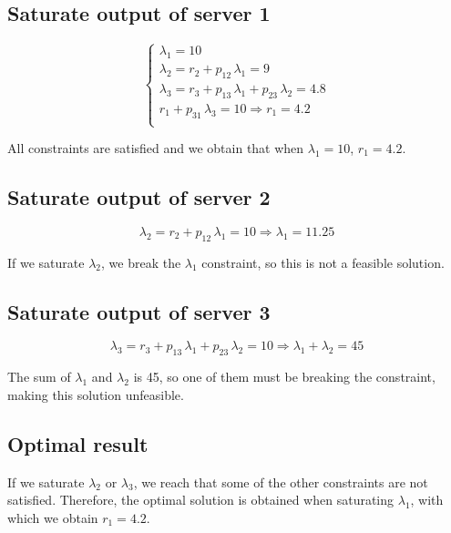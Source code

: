 \documentclass{article}
\begin{document}
\subsection{Saturate output of server 1}

\begin{equation}
  \begin{cases}
    \lambda_1=10 \\
    \lambda_2 = r_2 + p_{12} \, \lambda_1 = 9\\
    \lambda_3 = r_3 + p_{13} \, \lambda_1 + p_{23}\,\lambda_2 = 4.8 \\
    r_1 + p_{31}\,\lambda_3=10 \Rightarrow r_1 = 4.2\\
  \end{cases}
\end{equation}

All constraints are satisfied and we obtain that when $\lambda_1=10$, $r_1=4.2$.

\subsection{Saturate output of server 2}

\begin{equation}
  \lambda_2=r_2+p_{12}\,\lambda_1 =10 \Rightarrow \lambda_1 = 11.25
\end{equation}

If we saturate $\lambda_2$, we break the $\lambda_1$ constraint, so this is not a feasible solution.

\subsection{Saturate output of server 3}

\begin{equation}
  \lambda_3=r_3+p_{13}\,\lambda_1 + p_{23} \, \lambda_2 = 10 \Rightarrow \lambda_1 + \lambda_2 = 45
\end{equation}

The sum of $\lambda_1$ and $\lambda_2$ is 45, so one of them must be breaking the constraint, making this solution unfeasible.

\subsection{Optimal result}

If we saturate $\lambda_2$ or $\lambda_3$, we reach that some of the other constraints are not satisfied. Therefore, the optimal solution is obtained when saturating $\lambda_1$, with which we obtain $r_1=4.2$.
\end{document}
